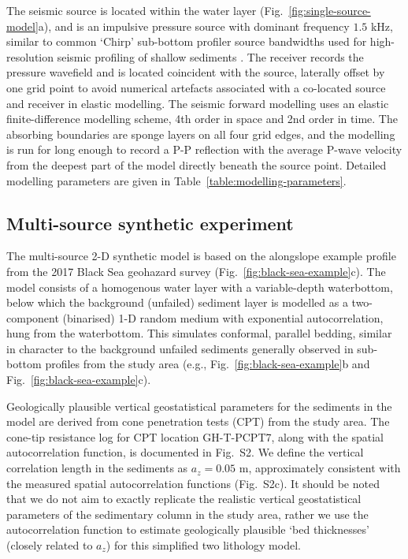 \documentclass[se,manuscript]{copernicus}
\begin{document}
The seismic source is located within the water layer (Fig.~\ref{fig:single-source-model}a), and is an impulsive pressure source with dominant frequency $1.5$ \unit{kHz}, similar to common `Chirp' sub-bottom profiler source bandwidths used for high-resolution seismic profiling of shallow sediments \citep{gutowski2002chirp}.
The receiver records the pressure wavefield and is located coincident with the source, laterally offset by one grid point to avoid numerical artefacts associated with a co-located source and receiver in elastic modelling.
The seismic forward modelling uses an elastic finite-difference modelling scheme, 4th order in space and 2nd order in time.
The absorbing boundaries are sponge layers on all four grid edges, and the modelling is run for long enough to record a P-P reflection with the average P-wave velocity from the deepest part of the model directly beneath the source point.
Detailed modelling parameters are given in Table~\ref{table:modelling-parameters}.

\subsection{Multi-source synthetic experiment}
\label{sec:methodology-realistic}

The multi-source 2-D synthetic model is based on the alongslope example profile from the 2017 Black Sea geohazard survey (Fig.~\ref{fig:black-sea-example}c).
The model consists of a homogenous water layer with a variable-depth waterbottom, below which the background (unfailed) sediment layer is modelled as a two-component (binarised) 1-D random medium with exponential autocorrelation, hung from the waterbottom.
This simulates conformal, parallel bedding, similar in character to the background unfailed sediments generally observed in sub-bottom profiles from the study area (e.g., Fig.~\ref{fig:black-sea-example}b and Fig.~\ref{fig:black-sea-example}c).

Geologically plausible vertical geostatistical parameters for the sediments in the model are derived from cone penetration tests (CPT) from the study area.
The cone-tip resistance log for CPT location GH-T-PCPT7, along with the spatial autocorrelation function, is documented in Fig.~S2.
We define the vertical correlation length in the sediments as $a_z=0.05$ \unit{m}, approximately consistent with the measured spatial autocorrelation functions (Fig.~S2c).
It should be noted that we do not aim to exactly replicate the realistic vertical geostatistical parameters of the sedimentary column in the study area, rather we use the autocorrelation function to estimate geologically plausible `bed thicknesses' (closely related to $a_z$) for this simplified two lithology model.
\end{document}
